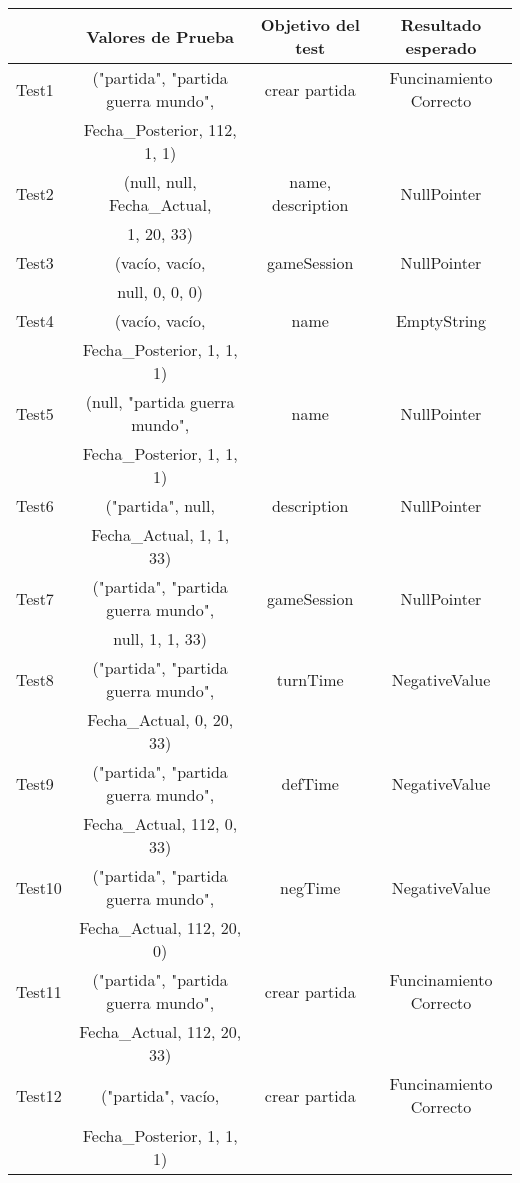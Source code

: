 {\footnotesize
\begin{longtable}[c]{lccc}
 & \textbf{Valores de Prueba} & \textbf{Objetivo del test} & \textbf{Resultado esperado} \\
\hline \hline
\endhead

Test1 & ("partida", "partida guerra mundo",  & crear partida & Funcinamiento Correcto \\
 & Fecha\_Posterior, 112, 1, 1) & & \\
Test2 & (null, null, Fecha\_Actual, & name, description & NullPointer\\
 & 1, 20, 33) & & \\
Test3 & (vacío, vacío, & gameSession & NullPointer\\
 & null, 0, 0, 0) & & \\


Test4 & (vacío, vacío,  & name & EmptyString\\
 &  Fecha\_Posterior, 1, 1, 1) & & \\
Test5 & (null, "partida guerra mundo",  & name & NullPointer\\
 &   Fecha\_Posterior, 1, 1, 1) & & \\
Test6 & ("partida", null,  & description  & NullPointer\\
 &  Fecha\_Actual, 1, 1, 33) & & \\
Test7 & ("partida", "partida guerra mundo",  & gameSession & NullPointer\\
 &   null, 1, 1, 33) & & \\
Test8 & ("partida", "partida guerra mundo",  & turnTime & NegativeValue\\
 &   Fecha\_Actual, 0, 20, 33) & & \\
Test9 & ("partida", "partida guerra mundo",  & defTime & NegativeValue\\
 &   Fecha\_Actual, 112, 0, 33) & & \\
Test10 & ("partida", "partida guerra mundo",  & negTime & NegativeValue\\
 &  Fecha\_Actual, 112, 20, 0) & & \\
Test11 & ("partida", "partida guerra mundo",  & crear partida & Funcinamiento Correcto \\
 &  Fecha\_Actual, 112, 20, 33) & & \\
Test12 & ("partida", vacío,   & crear partida & Funcinamiento Correcto \\
 &  Fecha\_Posterior, 1, 1, 1) & & \\

\hline
\end{longtable}
}

